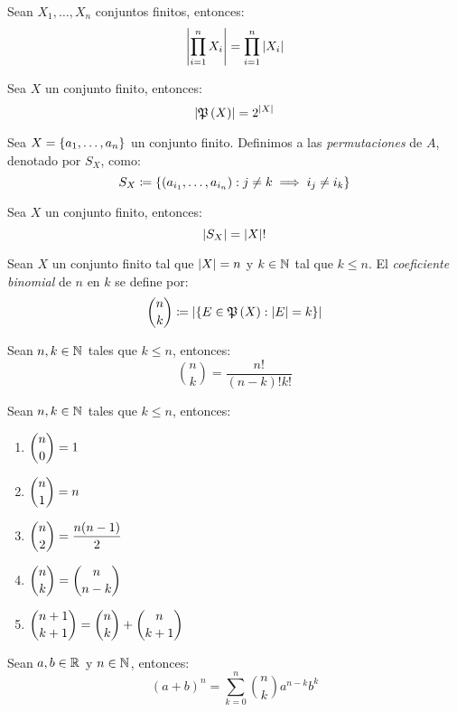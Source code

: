 \begin{coll}
	Sean $X_{1},\dotsc, X_{n}$ conjuntos finitos, entonces:
	\[ \left\vert \prod_{i = 1}^{n}X_{i} \right\vert =\prod_{i = 1}^{n}\left\vert X_{i} \right\vert \]
\end{coll}
\begin{theorem}
	Sea $X$ un conjunto finito, entonces:
	\[ \abs{\mpow{X}} = 2^{\abs{X}} \]
\end{theorem}
\begin{definition}[Permutaciones]
	Sea $X =\left\{ a_{1},\dotsc, a_{n} \right\}$ un conjunto finito. Definimos a las \emph{permutaciones} de $A$, denotado por $S_{X}$, como:
	\[ S_{X}\coloneqq\left\{ \left( a_{i_{1}},\dotsc, a_{i_{n}} \right):j\neq k\implies i_{j}\neq i_{k} \right\} \]
\end{definition}
\begin{theorem}
	Sea $X$ un conjunto finito, entonces:
	\[ \left\vert S_{X} \right\vert = \left\vert X \right\vert! \]
\end{theorem}
\begin{definition}
	Sean $X$ un conjunto finito tal que $\left\vert X \right\vert = n$ y $k\in\mathbb{N}^{}$ tal que $k\leq n$. El \emph{coeficiente binomial} de $n$ en $k$ se define por:
	\[ \binom{n}{k}\coloneqq\abs{\set{E\in\mpow{X}:\abs{E} = k}} \]
\end{definition}
\begin{theorem}
	Sean $n, k\in\mathbb{N}^{}$ tales que $k\leq n$, entonces:
	\[ \binom{n}{k} =\dfrac{n!}{(n - k)!k!} \]
\end{theorem}
\begin{theorem}
	Sean $n, k\in\mathbb{N}^{}$ tales que $k\leq n$, entonces:
	\begin{multicols}{2}
		\begin{enumerate}
			\item $\displaystyle\binom{n}{0} = 1$
			\item $\displaystyle\binom{n}{1} = n$
			\item $\displaystyle\binom{n}{2} = \dfrac{n(n - 1)}{2}$
			\item $\displaystyle\binom{n}{k} =\binom{n}{n - k}$
			\item $\displaystyle\binom{n + 1}{k + 1} =\binom{n}{k} +\binom{n}{k + 1}$
		\end{enumerate}
	\end{multicols}
\end{theorem}
\begin{theorem}
	Sean $a, b\in\mathbb{R}^{}$ y $n\in\mathbb{N}^{}$, entonces:
	\[ (a + b)^{n} =\sum_{k = 0}^{n}\binom{n}{k}a^{n - k}b^{k} \]
\end{theorem}
